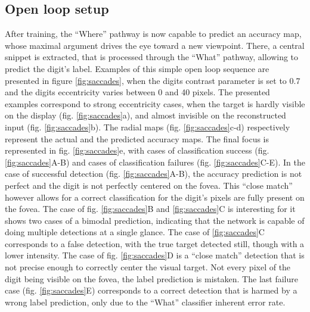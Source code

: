\subsection*{Open loop setup}
After training, the ``Where'' pathway is now capable to predict an accuracy map, whose maximal argument drives the eye toward a new viewpoint. There, a central snippet is extracted, that is processed through the ``What'' pathway, allowing to predict the digit's label. Examples of this simple open loop sequence are presented in figure \ref{fig:saccades}, when the digits contrast parameter is set to 0.7 and the digits eccentricity varies between 0 and 40 pixels. The presented examples correspond to strong eccentricity cases, when the target is hardly visible on the display (fig. \ref{fig:saccades}a), and almost invisible on the reconstructed input (fig. \ref{fig:saccades}b). The radial maps (fig. \ref{fig:saccades}c-d) respectively represent the actual and the predicted accuracy maps. The final focus is represented in fig. \ref{fig:saccades}e, with cases of classification success (fig. \ref{fig:saccades}A-B) and cases of classification failures (fig. \ref{fig:saccades}C-E).  
In the case of successful detection (fig. \ref{fig:saccades}A-B), the accuracy prediction is not perfect and the digit is not perfectly centered on the fovea. This ``close match'' however allows for a correct classification for the digit's pixels are fully present on the fovea. The case of fig. \ref{fig:saccades}B and \ref{fig:saccades}C
 is interesting for it shows two cases of a bimodal prediction, indicating that the network is capable of doing multiple detections at a single glance. The case of \ref{fig:saccades}C corresponds to a false detection, with the true target detected still, though with a lower intensity. The case of fig. \ref{fig:saccades}D is a ``close match'' detection that is not precise enough to correctly center the visual target. Not every pixel of the digit being visible on the fovea, the label prediction is mistaken.
The last failure case (fig. \ref{fig:saccades}E) corresponds to a correct detection that is harmed by a wrong label prediction, only due to the ``What'' classifier inherent error rate.  


